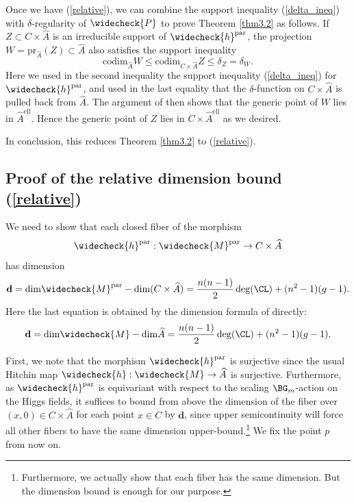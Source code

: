 Once we have (\ref{relative}),
we can combine the support inequality (\ref{delta_ineq}) with $\delta$-regularity of
$\widecheck{P}$ \cite[corollary 5.4.4]{dC_SL} to prove
Theorem \ref{thm3.2} as follows.  If $Z \subset C \times \widehat{A}$ is an irreducible support of $\widecheck{h}^{\mathrm{par}}$, the projection $W = \mathrm{pr}_{\widehat{A}}(Z) \subset \hat{A}$ also satisfies the support inequality
\[
\mathrm{codim}_{\widehat{A}} W \leq \mathrm{codim}_{C\times \widehat{A}}Z \leq \delta_Z = \delta_W.
\]
Here we used in the second inequality the support inequality (\ref{delta_ineq}) for $\widecheck{h}^{\mathrm{par}}$, and used in the last equality that the $\delta$-function on $C\times \widehat{A}$ is pulled back from $\widehat{A}$. The argument of \cite[Section 6.2]{dC_SL} then shows that the generic point of $W$ lies in $\widehat{A}^{\mathrm{ell}}$. Hence the generic point of $Z$ lies in $C\times \widehat{A}^{\mathrm{ell}}$ as we desired.




In conclusion, this reduces Theorem \ref{thm3.2} to (\ref{relative}).



\subsection{Proof of the relative dimension bound (\ref{relative})}\label{sec4.4}

We need to show that each closed fiber of the morphism
$$\widecheck{h}^{\mathrm{par}}: \widecheck{M}^{\mathrm{par}} \rightarrow C\times \widehat{A}$$
has dimension
\[
\mathbf{d} = \mathrm{dim}\widecheck{M}^{\mathrm{par}} - \mathrm{dim} (C\times \widehat{A}) =    \frac{n(n-1)}{2}\deg(\CL) + (n^2-1)(g-1).\]
Here the last equation is obtained by the dimension formula of \cite[Proposition 2.4.6]{dC_SL} directly:
\[
\mathbf{d} =  \mathrm{dim}\widecheck{M} - \mathrm{dim}\widehat{A} = \frac{n(n-1)}{2} \deg(\CL) + (n^2-1)(g-1).
\]



First,  we note that the morphism $\widecheck{h}^{\mathrm{par}}$ is surjective since the usual Hitchin map $\widecheck{h}: \widecheck{M} \to \widehat{A}$ is surjective. Furthermore, as $\widecheck{h}^{\mathrm{par}}$ is equivariant with respect to the scaling $\BG_m$-action on the Higgs fields, it suffices to bound from above the dimension of the fiber over $(x, 0) \in C\times \widehat{A}$ for each point $x \in C$ by $\mathbf{d}$, since upper semicontinuity will force all other fibers to have the same dimension upper-bound.\footnote{Furthermore, we actually show that each fiber has the same dimension. But the dimension bound is enough for our purpose.}  We fix the point $p$ from now on.

